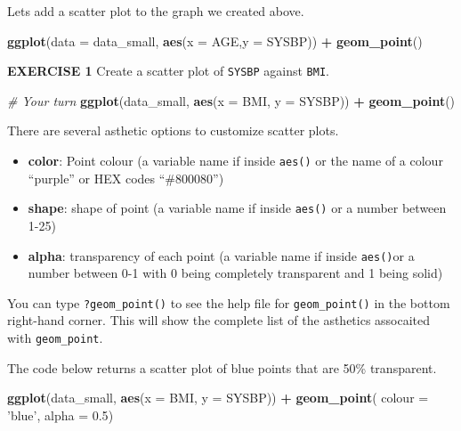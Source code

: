 \documentclass[
]{article}
\newenvironment{Shaded}{\begin{snugshade}}{\end{snugshade}}
\newcommand{\CommentTok}[1]{\textcolor[rgb]{0.56,0.35,0.01}{\textit{#1}}}
\newcommand{\DataTypeTok}[1]{\textcolor[rgb]{0.13,0.29,0.53}{#1}}
\newcommand{\FloatTok}[1]{\textcolor[rgb]{0.00,0.00,0.81}{#1}}
\newcommand{\KeywordTok}[1]{\textcolor[rgb]{0.13,0.29,0.53}{\textbf{#1}}}
\newcommand{\NormalTok}[1]{#1}
\newcommand{\OperatorTok}[1]{\textcolor[rgb]{0.81,0.36,0.00}{\textbf{#1}}}
\newcommand{\StringTok}[1]{\textcolor[rgb]{0.31,0.60,0.02}{#1}}
\providecommand{\tightlist}{%
  \setlength{\itemsep}{0pt}\setlength{\parskip}{0pt}}
\begin{document}
Lets add a scatter plot to the graph we created above.

\begin{Shaded}
\begin{Highlighting}[]
\KeywordTok{ggplot}\NormalTok{(}\DataTypeTok{data =}\NormalTok{ data_small, }
       \KeywordTok{aes}\NormalTok{(}\DataTypeTok{x =}\NormalTok{ AGE,}\DataTypeTok{y =}\NormalTok{ SYSBP))  }\OperatorTok{+}\StringTok{ }
\StringTok{  }\KeywordTok{geom_point}\NormalTok{()}
\end{Highlighting}
\end{Shaded}

\textbf{EXERCISE 1} Create a scatter plot of \texttt{SYSBP} against
\texttt{BMI}.

\begin{Shaded}
\begin{Highlighting}[]
\CommentTok{# Your turn}
\KeywordTok{ggplot}\NormalTok{(data_small, }
       \KeywordTok{aes}\NormalTok{(}\DataTypeTok{x =}\NormalTok{ BMI, }\DataTypeTok{y =}\NormalTok{ SYSBP)) }\OperatorTok{+}\StringTok{ }
\StringTok{  }\KeywordTok{geom_point}\NormalTok{()}
\end{Highlighting}
\end{Shaded}

There are several asthetic options to customize scatter plots.

\begin{itemize}
\tightlist
\item
  \textbf{color}: Point colour (a variable name if inside \texttt{aes()}
  or the name of a colour ``purple'' or HEX codes ``\#800080'')
\item
  \textbf{shape}: shape of point (a variable name if inside
  \texttt{aes()} or a number between 1-25)
\item
  \textbf{alpha}: transparency of each point (a variable name if inside
  \texttt{aes()}or a number between 0-1 with 0 being completely
  transparent and 1 being solid)
\end{itemize}

You can type \texttt{?geom\_point()} to see the help file for
\texttt{geom\_point()} in the bottom right-hand corner. This will show
the complete list of the asthetics assocaited with \texttt{geom\_point}.

The code below returns a scatter plot of blue points that are 50\%
transparent.

\begin{Shaded}
\begin{Highlighting}[]
\KeywordTok{ggplot}\NormalTok{(data_small, }
       \KeywordTok{aes}\NormalTok{(}\DataTypeTok{x =}\NormalTok{ BMI, }\DataTypeTok{y =}\NormalTok{ SYSBP)) }\OperatorTok{+}\StringTok{ }
\StringTok{  }\KeywordTok{geom_point}\NormalTok{( }\DataTypeTok{colour =} \StringTok{'blue'}\NormalTok{, }
              \DataTypeTok{alpha =} \FloatTok{0.5}\NormalTok{)}
\end{Highlighting}
\end{Shaded}
\end{document}
